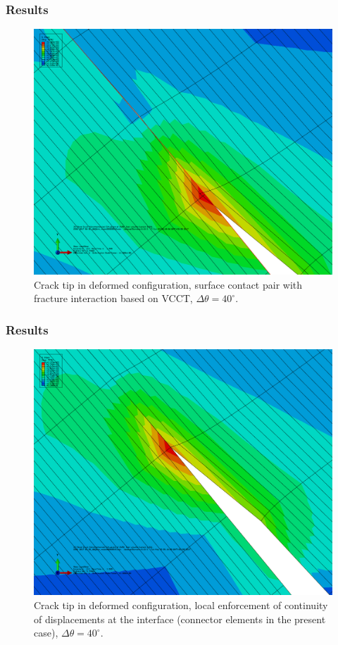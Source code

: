 \documentclass[first,firstsupp,lastsupp,handout,last,hyperref,table]{ETHclass}
\begin{document}
\begin{frame}
\frametitle{Results}
\vspace{-0.7cm}
\centering
\captionsetup[figure]{font=scriptsize,labelfont=scriptsize}
\begin{figure}[!h]
\centering
\includegraphics[height=0.7\textheight]{cracktip-detail-debondsurf.png}
  \caption{\scriptsize Crack tip in deformed configuration, surface contact pair with fracture interaction based on VCCT, $\Delta\theta=40^{\circ}$.}
  \label{fig:res6}
\end{figure}
\end{frame}

\begin{frame}
\frametitle{Results}
\vspace{-0.7cm}
\centering
\captionsetup[figure]{font=scriptsize,labelfont=scriptsize}
\begin{figure}[!h]
\centering
\includegraphics[height=0.7\textheight]{cracktip-detail-connel.png}
  \caption{\scriptsize Crack tip in deformed configuration, local enforcement of continuity of displacements at the interface (connector elements in the present case), $\Delta\theta=40^{\circ}$.}
  \label{fig:res6}
\end{figure}
\end{frame}
\end{document}
